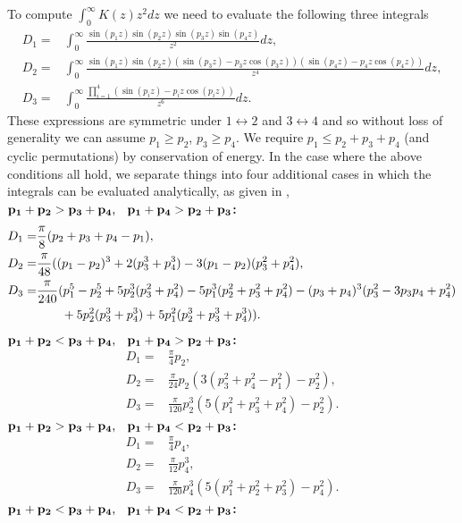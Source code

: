To compute $\int_0^\infty K(z) z^2 dz$ we need to evaluate the following three integrals
\begin{align}
D_1=&\int_0^\infty \frac{\sin(p_1z)\sin(p_2z)\sin(p_3z)\sin(p_4z)}{z^2}dz,\\
D_2=&\int_0^\infty\frac{\sin(p_1z)\sin(p_2z)(\sin(p_3z)-p_3z\cos(p_3z))(\sin(p_4z)-p_4z\cos(p_4z))}{z^4}dz,\\
D_3=&\int_0^\infty\frac{\prod_{i=1}^4(\sin(p_iz)-p_iz\cos(p_iz))}{z^6}dz.
\end{align}
These expressions are symmetric under $1\leftrightarrow 2$ and $3\leftrightarrow 4$ and so without loss of generality we can assume $p_1\geq p_2$, $p_3\geq p_4$. We require $p_1\leq p_2+p_3+p_4$ (and cyclic permutations) by conservation of energy.  In the case where the above conditions all hold, we separate things into four additional cases in which the integrals can be evaluated analytically, as given in \cite{Dolgov_Hansen},\\
${\bf p_1+p_2>p_3+p_4\text{, \hspace{1mm} }p_1+p_4>p_2+p_3}${\bf :}
\begin{align}
D_1=&\frac{\pi}{8}(p_2+p_3+p_4-p_1),\\
D_2=&\frac{\pi}{48}((p_1-p_2)^3+2(p_3^3+p_4^3)-3(p_1-p_2)(p_3^2+p_4^2),\\
D_3=&\frac{\pi}{240}(p_1^5-p_2^5+5p_2^3(p_3^2+p_4^2)-5p_1^3(p_2^2+p_3^2+p_4^2)-(p_3+p_4)^3(p_3^2-3p_3p_4+p_4^2)\notag\\
&\hspace{7mm}+5p_2^2(p_3^3+p_4^3)+5p_1^2(p_2^3+p_3^3+p_4^3)).
\end{align}
${\bf p_1+p_2<p_3+p_4\text{, \hspace{1mm} }p_1+p_4>p_2+p_3}${\bf :}
\begin{align}
D_1=&\frac{\pi }{4}p_2,\\
D_2=&\frac{\pi }{24}p_2(3(p_3^2+p_4^2-p_1^2)-p_2^2),\\
D_3=&\frac{\pi}{120}p_2^3(5(p_1^2+p_3^2+p_4^2)-p_2^2).
\end{align}
${\bf p_1+p_2>p_3+p_4\text{, \hspace{1mm} }p_1+p_4<p_2+p_3}${\bf :}
\begin{align}
D_1=&\frac{\pi }{4}p_4,\\
D_2=&\frac{\pi}{12} p_4^3,\\
D_3=&\frac{\pi }{120}p_4^3(5(p_1^2+p_2^2+p_3^2)-p_4^2).
\end{align}
${\bf p_1+p_2<p_3+p_4\text{, \hspace{1mm} }p_1+p_4<p_2+p_3}${\bf :}
